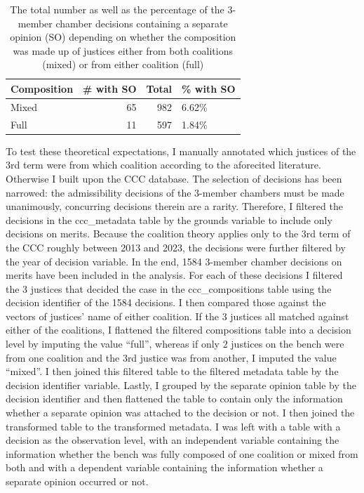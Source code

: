 \documentclass[
  11pt,
]{article}
\begin{document}
\begin{table}
\centering
\caption{\label{tab:coalitions}The total number as well as the percentage of the 3-member chamber decisions containing a separate opinion (SO) depending on whether the composition was made up of justices either from both coalitions (mixed) or from either coalition (full)}
\centering
\begin{tabular}[t]{l|r|r|l}
\hline
Composition & \# with SO & Total & \% with SO\\
\hline
Mixed & 65 & 982 & 6.62\%\\
\hline
Full & 11 & 597 & 1.84\%\\
\hline
\end{tabular}
\end{table}

To test these theoretical expectations, I manually annotated which justices of the 3rd term were from which coalition according to the aforecited literature. Otherwise I built upon the CCC database. The selection of decisions has been narrowed: the admissibility decisions of the 3-member chambers must be made unanimously, concurring decisions therein are a rarity. Therefore, I filtered the decisions in the ccc\_metadata table by the grounds variable to include only decisions on merits. Because the coalition theory applies only to the 3rd term of the CCC roughly between 2013 and 2023, the decisions were further filtered by the year of decision variable. In the end, 1584 3-member chamber decisions on merits have been included in the analysis. For each of these decisions I filtered the 3 justices that decided the case in the ccc\_compositions table using the decision identifier of the 1584 decisions. I then compared those against the vectors of justices' name of either coalition. If the 3 justices all matched against either of the coalitions, I flattened the filtered compositions table into a decision level by imputing the value ``full'', whereas if only 2 justices on the bench were from one coalition and the 3rd justice was from another, I imputed the value ``mixed''. I then joined this filtered table to the filtered metadata table by the decision identifier variable. Lastly, I grouped by the separate opinion table by the decision identifier and then flattened the table to contain only the information whether a separate opinion was attached to the decision or not. I then joined the transformed table to the transformed metadata. I was left with a table with a decision as the observation level, with an independent variable containing the information whether the bench was fully composed of one coalition or mixed from both and with a dependent variable containing the information whether a separate opinion occurred or not.
\end{document}
